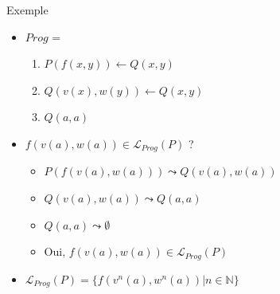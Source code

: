 \begin{frame}{Exemple}
  \begin{itemize}[<+->]
  \item $Prog$ =
    \begin{enumerate}
    \item {}$P(f(x,y)) \leftarrow Q(x, y)$ \\
    \item {}$Q(v(x), w(y)) \leftarrow Q(x, y)$ \\
    \item {}$Q(a, a)$
    \end{enumerate}
  \end{itemize}
  \begin{exampleblock}{}
    \begin{itemize}[<+->]
    \item $f(v(a),w(a)) \in \mathcal{L}_{Prog}(P)$ ?
      \begin{itemize}
      \item $P(f(v(a),w(a))) \leadsto Q(v(a), w(a))$ \\
      \item $Q(v(a), w(a)) \leadsto Q(a, a)$ \\
      \item $Q(a, a) \leadsto \emptyset$
      \item Oui, $f(v(a),w(a)) \in \mathcal{L}_{Prog}(P)$
      \end{itemize}
    \end{itemize}
  \end{exampleblock}
  \begin{itemize}
  \item<10> $\mathcal{L}_{Prog}(P) = \{f(v^n(a),w^n(a)) | n \in \mathbb{N}\}$
  \end{itemize}
\end{frame}

